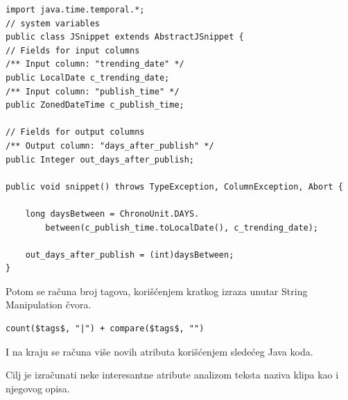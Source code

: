 \documentclass[a4paper]{article}
\theoremstyle{definition}
\begin{document}
\begin{lstlisting}
import java.time.temporal.*;
// system variables
public class JSnippet extends AbstractJSnippet {
// Fields for input columns
/** Input column: "trending_date" */
public LocalDate c_trending_date;
/** Input column: "publish_time" */
public ZonedDateTime c_publish_time;

// Fields for output columns
/** Output column: "days_after_publish" */
public Integer out_days_after_publish;

public void snippet() throws TypeException, ColumnException, Abort {

	long daysBetween = ChronoUnit.DAYS.
		between(c_publish_time.toLocalDate(), c_trending_date);

	out_days_after_publish = (int)daysBetween;
}
\end{lstlisting}

Potom se računa broj tagova, korišćenjem kratkog izraza unutar String Manipulation čvora.

\begin{verbatim}
count($tags$, "|") + compare($tags$, "")
\end{verbatim}

I na kraju se računa više novih atributa korišćenjem sledećeg Java koda.

Cilj je izračunati neke interesantne atribute analizom teksta naziva klipa kao i njegovog opisa.
\end{document}
